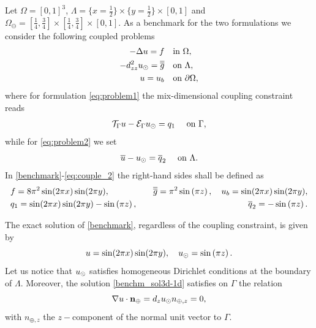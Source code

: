 \documentclass[r]{siamart171218}
\begin{document}
Let $\Omega=[0,1]^3$, $\Lambda=\{x=\tfrac{1}{2}\}\times \{y=\tfrac{1}{2}\} \times [0,1] $
and $\Omega_{\ominus}=[\tfrac{1}{4}, \tfrac{3}{4}]\times [\tfrac{1}{4}, \tfrac{3}{4}]\times [0, 1]$.
As a benchmark for the two formulations we consider the following coupled problems
%
\begin{subequations}\label{benchmark}
\begin{align}
\label{benchm_3d}
-\Delta u=f \quad &\text{in $\Omega$},\\
\label{benchm_1d}
-d_{zz}^2 \ud =\avrd{g} \quad &\text{on $\Lambda$},\\
u=u_b \quad &\text{on $\partial \Omega$},
\end{align}
\end{subequations}
where for formulation \eqref{eq:problem1} the mix-dimensional coupling constraint reads
\begin{equation}
  \label{eq:couple_1}
\trace{u} - \ext{\ud} = q_1\quad\text{ on }\Gamma,
\end{equation}
while for \eqref{eq:problem2} we set
\begin{equation}
    \label{eq:couple_2}
\avrc{u} - \ud = \avrc{q}_2\quad\text{ on }\Lambda.
\end{equation}
%
In \eqref{benchmark}-\eqref{eq:couple_2} the right-hand sides shall be defined as 
\begin{eqnarray*}
  &f=8\pi ^2 \sin (2\pi x) \sin (2\pi y),\quad &\overline{\overline{g}}={\pi ^2}\sin \left({\pi z}\right),\quad u_b=\sin (2\pi x) \sin (2\pi y),\\
  &q_1=\sin (2\pi x) \sin (2\pi y) - \sin \left({\pi z}\right),\quad &\overline{q}_2=-\sin \left({\pi z}\right).
\end{eqnarray*}

The exact solution of \eqref{benchmark}, regardless of the coupling constraint,
is given by
%
\begin{equation}
\label{benchm_sol3d-1d}
u=\sin (2\pi x) \sin (2\pi y),
\quad
\ud=\sin \left({\pi z}\right).
\end{equation}
%
Let us notice that $u_{\odot}$ satisfies homogeneous Dirichlet conditions at the boundary of $\Lambda$.
Moreover, the solution \eqref{benchm_sol3d-1d} satisfies on $\Gamma$ the relation
\begin{equation}\label{benchm_flux}
\nabla u \cdot \textbf{n}_{\oplus}=d_z \ud n_{\oplus,z}=0,
\end{equation}
with $n_{\oplus,z}$ the $z-$component of the normal unit vector to $\Gamma$.
\end{document}
